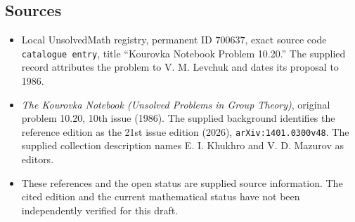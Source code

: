 \documentclass[11pt]{article}
\begin{document}
\subsection{Sources}
\begin{itemize}
\item Local UnsolvedMath registry, permanent ID \(700637\), exact source code \texttt{catalogue entry}, title ``Kourovka Notebook Problem 10.20.'' The supplied record attributes the problem to V. M. Levchuk and dates its proposal to 1986.
\item \emph{The Kourovka Notebook (Unsolved Problems in Group Theory)}, original problem 10.20, 10th issue (1986). The supplied background identifies the reference edition as the 21st issue edition (2026), \texttt{arXiv:1401.0300v48}. The supplied collection description names E. I. Khukhro and V. D. Mazurov as editors.
\item These references and the open status are supplied source information. The cited edition and the current mathematical status have not been independently verified for this draft.
\end{itemize}
\end{document}
